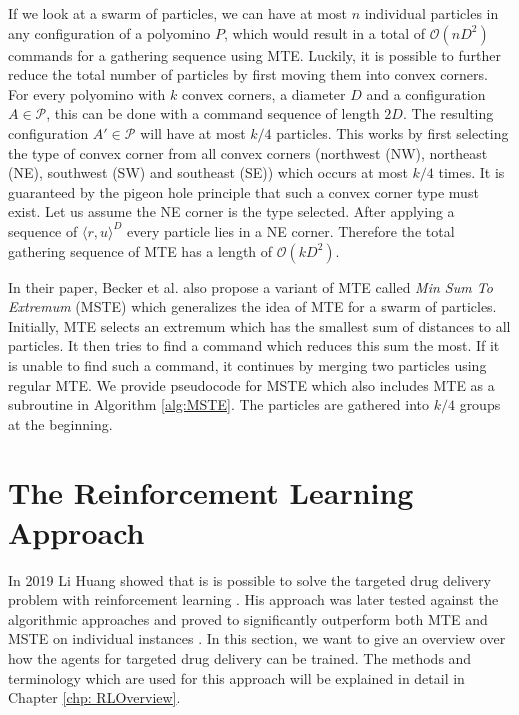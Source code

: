 If we look at a swarm of particles, we can have at most $n$ individual particles in any configuration of a polyomino $P$, which would result in a total of $\mathcal{O}(nD^2)$ commands for a gathering sequence using MTE. Luckily, it is possible to further reduce the total number of particles by first moving them into convex corners. For every polyomino with $k$ convex corners, a diameter $D$ and a configuration $A \in \mathcal{P}$, this can be done with a command sequence of length $2D$. The resulting configuration $A' \in \mathcal{P}$ will have at most $k/4$ particles. This works by first selecting the type of convex corner from all convex corners (northwest (NW), northeast (NE), southwest (SW) and southeast (SE)) which occurs at most $k/4$ times. It is guaranteed by the pigeon hole principle that such a convex corner type must exist. Let us assume the NE corner is the type selected. After applying a sequence of $\langle r, u \rangle^D$ every particle lies in a NE corner. Therefore the total gathering sequence of MTE has a length of $\mathcal{O}(kD^2)$. 

In their paper, Becker et al. also propose a variant of MTE called \textit{Min Sum To Extremum} (MSTE) which generalizes the idea of MTE for a swarm of particles. Initially, MTE selects an extremum which has the smallest sum of distances to all particles. It then tries to find a command which reduces this sum the most. If it is unable to find such a command, it continues by merging two particles using regular MTE. We provide pseudocode for MSTE which also includes MTE as a subroutine in Algorithm \ref{alg:MSTE}. The particles are gathered into $k/4$ groups at the beginning.

\section{The Reinforcement Learning Approach} \label{sec:TDDRL}
In 2019 Li Huang showed that is is possible to solve the targeted drug delivery problem with reinforcement learning \cite{huang2019}. His approach was later tested against the algorithmic approaches and proved to significantly outperform both MTE and MSTE on individual instances \cite{becker2020}. In this section, we want to give an overview over how the agents for targeted drug delivery can be trained. The methods and terminology which are used for this approach will be explained in detail in Chapter \ref{chp: RLOverview}.

